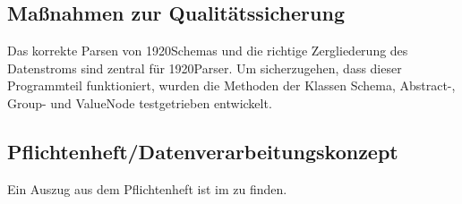 \subsection{Maßnahmen zur Qualitätssicherung}
\label{sec:Qualitaetssicherung}
Das korrekte Parsen von 1920Schemas und die richtige Zergliederung des Datenstroms sind zentral für 1920Parser. Um sicherzugehen, dass dieser Programmteil funktioniert,  wurden die Methoden der Klassen Schema, Abstract-, Group- und ValueNode  testgetrieben entwickelt.

\subsection{Pflichtenheft/Datenverarbeitungskonzept}
\label{sec:Pflichtenheft}
Ein Auszug aus dem Pflichtenheft ist im  zu finden.


